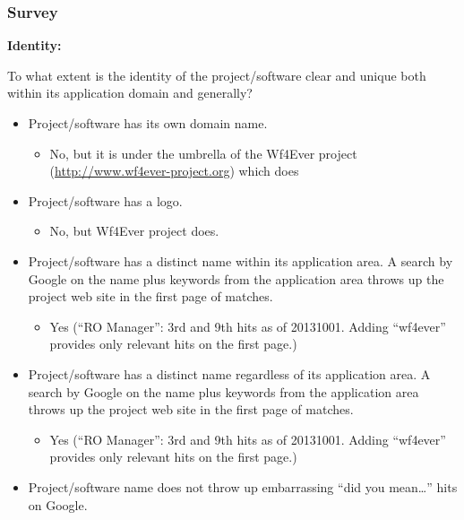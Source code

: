 \subsubsection{Survey}

\textbf{Identity:}

To what extent is the identity of the project/software clear and unique
both within its application domain and generally?

\begin{itemize}
\itemsep1pt\parskip0pt
\item
  Project/software has its own domain name.

  \begin{itemize}
  \itemsep1pt\parskip0pt
  \item
    No, but it is under the umbrella of the Wf4Ever project
    (\url{http://www.wf4ever-project.org}) which does
  \end{itemize}
\item
  Project/software has a logo.

  \begin{itemize}
  \itemsep1pt\parskip0pt
  \item
    No, but Wf4Ever project does.
  \end{itemize}
\item
  Project/software has a distinct name within its application area. A
  search by Google on the name plus keywords from the application area
  throws up the project web site in the first page of matches.

  \begin{itemize}
  \itemsep1pt\parskip0pt
  \item
    Yes (``RO Manager'': 3rd and 9th hits as of 20131001. Adding
    ``wf4ever'' provides only relevant hits on the first page.)
  \end{itemize}
\item
  Project/software has a distinct name regardless of its application
  area. A search by Google on the name plus keywords from the
  application area throws up the project web site in the first page of
  matches.

  \begin{itemize}
  \itemsep1pt\parskip0pt
  \item
    Yes (``RO Manager'': 3rd and 9th hits as of 20131001. Adding
    ``wf4ever'' provides only relevant hits on the first page.)
  \end{itemize}
\item
  Project/software name does not throw up embarrassing ``did you
  mean\ldots{}'' hits on Google.


\end{itemize}
